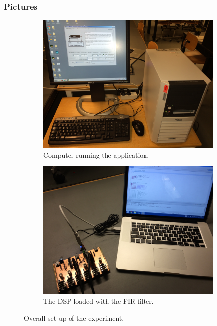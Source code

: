 \subsubsection{Pictures}
\begin{figure}[H]
	\centering
	\begin{subfigure}[b]{.495\textwidth}
		\centering
		\includegraphics[width=\textwidth]{../Journal/Experiments/Figures/Fullsetup1}
		\caption{Computer running the application.}
		\label{fig:FIRFullSetup1}
	\end{subfigure} 
	\begin{subfigure}[b]{.495\textwidth}
		\centering
		\includegraphics[width=\textwidth]{../Journal/Experiments/Figures/Fullsetup2}
		\caption{The DSP loaded with the FIR-filter.}
		\label{fig:FIRFullSetup2}
	\end{subfigure}
	\caption{Overall set-up of the experiment.}
		\label{fig:FIRFullSetup}
\end{figure}


